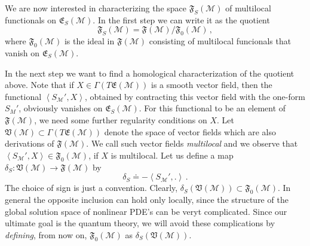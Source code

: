 \documentclass[11pt]{article}
\newcommand{\E}{\mathfrak{E}}
\newcommand{\V}{\mathfrak{V}}
\newcommand{\F}{\mathfrak{F}}
\newcommand{\Mcal}{\mathcal{M}}
\newcommand{\1}{\mathds{1}}                         %
\begin{document}
{We are now interested in characterizing the space $\F_S(\Mcal)$ of multilocal functionals on $\E_S(\Mcal)$. In the first step we can write it as the quotient
\[
\F_S(\Mcal)=\F(\Mcal)/\F_0(\Mcal)\,,
\]
where $\F_0(\Mcal)$ is the ideal in $\F(\Mcal)$ consisting of multilocal funcionals that vanish on $\E_S(\Mcal)$. 

In the next step we want to find a homological characterization of the quotient above. Note that if $X\in\Gamma(T\E(\Mcal))$ is a smooth vector field, then the functional $\left< S_\Mcal',X\right>$, obtained by contracting this vector field with the one-form $S_M'$, obviously vanishes on $\E_S(\Mcal)$. For this functional to be an element of $\F(\Mcal)$, we need some further regularity conditions on $X$. Let $\V(\Mcal)\subset\Gamma(T\E(\Mcal))$ denote the space of vector fields which are also derivations of $\F(\Mcal)$. We call such vector fields \textit{multilocal} and we observe that $\left< S_\Mcal',X\right>\in\F_0
(\Mcal)$, if $X$ is multilocal. Let us define a map $\delta_S:\V(\Mcal)\rightarrow\F(\Mcal)$ by 
\[\delta_S\doteq -\left< S_\Mcal',.\right>\,.
\]
The choice of sign is just a convention. Clearly, $\delta_S(\V(\Mcal))\subset\F_0(\Mcal)$. In general the opposite inclusion can hold only locally, since the structure of the global solution space of nonlinear PDE's can be veryt complicated. Since our ultimate goal is the quantum theory, we will avoid these complications by \textit{defining}, from now on, $\F_0(\Mcal)$ as $\delta_S(\V(\Mcal))$.

}
\end{document}
